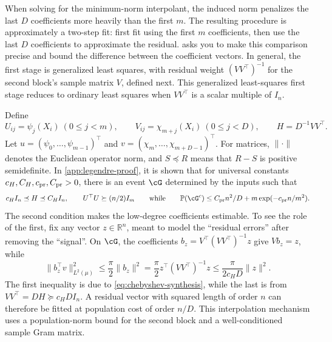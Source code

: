 \documentclass[11pt,twoside]{article}
\renewcommand{\P}{\mathbb P}
\newcommand{\R}{\mathbb R}
\theoremstyle{definition}
\theoremstyle{remark}
\begin{document}
When solving for the minimum-norm interpolant, the induced norm penalizes the
last $D$ coefficients more heavily than the first $m$.
The resulting procedure is approximately a two-step fit: first fit using the first $m$
coefficients, then use the last $D$ coefficients to approximate the residual.
 asks you to make this comparison precise
and bound the difference between the coefficient vectors. In general,
the first stage is generalized least squares, with residual weight
$(VV^\top)^{-1}$ for the second block's sample matrix $V$, defined next.
This generalized least-squares first stage reduces to ordinary least squares
when $VV^\top$ is a scalar multiple of $I_n$.

Define
\[
 U_{ij}=\psi_j(X_i)\ (0\le j<m),\qquad
 V_{ij}=\chi_{m+j}(X_i)\ (0\le j<D),\qquad
 H=D^{-1}VV^\top.
\]
Let $u=(\psi_0,\ldots,\psi_{m-1})^\top$ and
$v=(\chi_m,\ldots,\chi_{m+D-1})^\top$.
For matrices, $\|\cdot\|$ denotes the Euclidean operator norm, and
$S\preceq R$ means that $R-S$ is positive semidefinite.
In 
\cref{app:legendre-proof}, it is shown that
for universal constants $c_H,C_H,c_{\rm pr},C_{\rm pr}>0$, there is an
event $\cG$ determined by the inputs such that
\begin{equation}
 c_HI_n\preceq H\preceq C_HI_n,
 \qquad U^\top U\succeq(n/2)I_m
 \qquad \text{while}
 \qquad \P(\cG^c)\le C_{\rm pr}n^2/D
       +m\exp(-c_{\rm pr}n/m^2).
 \label{eq:good-event-summary}
\end{equation}
The second condition makes the low-degree coefficients estimable. To see
the role of the first, fix any vector $z\in\R^n$, meant to model the ``residual errors'' after
removing the ``signal''. 
On $\cG$, the
coefficients $b_z=V^\top(VV^\top)^{-1}z$ give $Vb_z=z$, while
\begin{equation}
 \|b_z^\top v\|_{L^2(\mu)}^2
 \le\frac\pi2\|b_z\|^2
 =\frac\pi2 z^\top(VV^\top)^{-1}z
 \le\frac{\pi}{2c_HD}\|z\|^2.
 \label{eq:residual-interpolation-cost}
\end{equation}
The first inequality is due to \cref{eq:chebyshev-synthesis}, while the last is 
from $VV^\top=DH\succeq c_HD I_n$.
A residual vector with squared length of order $n$ can therefore be fitted
at population cost of order $n/D$. This interpolation mechanism
uses a population-norm bound for the second block and a well-conditioned
sample Gram matrix.
\end{document}
